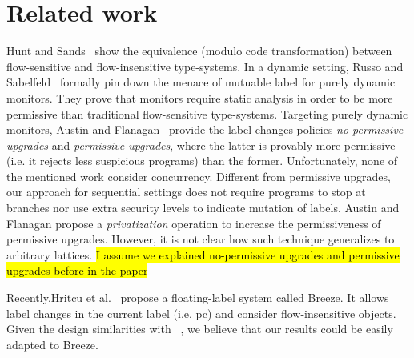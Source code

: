 \section{Related work}

Hunt and Sands~\citep{Hunt:2006} show the equivalence (modulo code
transformation) between flow-sensitive and flow-insensitive type-systems. In a
dynamic setting, Russo and Sabelfeld~\citep{Russo:2010} formally pin down the
menace of mutuable label for purely dynamic monitors. They prove that monitors
require static analysis in order to be more permissive than traditional
flow-sensitive type-systems. Targeting purely dynamic monitors, Austin and
Flanagan~\citep{Austin:Flanagan:PLAS10} provide the label changes policies
\emph{no-permissive upgrades} and \emph{permissive upgrades}, where the latter
is provably more permissive (i.e. it rejects less suspicious programs) than the
former. Unfortunately, none of the mentioned work consider
concurrency. Different from permissive upgrades, our approach for sequential
settings does not require programs to stop at branches nor use extra security
levels to indicate mutation of labels. Austin and Flanagan propose a
\emph{privatization} operation to increase the permissiveness of permissive
upgrades. However, it is not clear how such technique generalizes to arbitrary
lattices.
\hl{I assume we explained no-permissive upgrades and permissive upgrades 
before in the paper}

Recently,Hritcu et al.~\citep{10.1109/SP.2013.10} propose a floating-label
system called Breeze. It allows label changes in the current label (i.e. pc) and
consider flow-insensitive objects. Given the design similarities with
\LIO~\citep{stefan:lio}, we believe that our results could be easily adapted to
Breeze.



